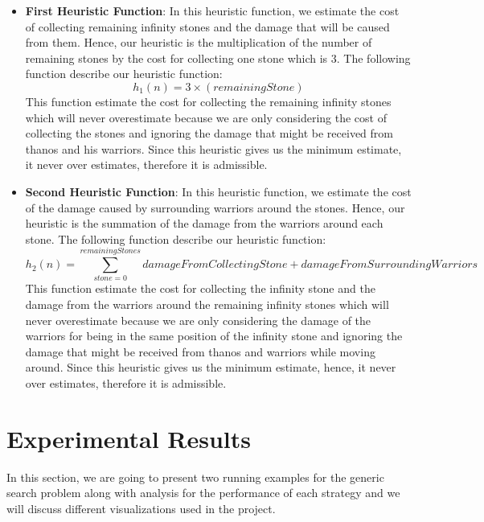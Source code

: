 \documentclass{article}
\begin{document}
\begin{itemize}
  \item \textbf{First Heuristic Function}: In this heuristic function, we estimate the cost of collecting remaining infinity stones and the damage that will be caused from them. Hence, our heuristic is the multiplication of the number of remaining stones by the cost for collecting one stone which is 3. The following function describe our heuristic function: 
   \begin{equation}
    h_{1}(n)=3 \times(remainingStone)
    \end{equation}
  This function estimate the cost for collecting the remaining infinity stones which will never overestimate because we are only considering the cost of collecting the stones and ignoring the damage that might be received from thanos and his warriors. Since this heuristic gives us the minimum estimate, it never over estimates, therefore it is admissible.

  \item \textbf{Second Heuristic Function}: In this heuristic function, we estimate the cost of the damage caused by surrounding warriors around the stones. Hence, our heuristic is the summation of the damage from the warriors around each stone. The following function describe our heuristic function:
  \begin{equation}
    h_{2}(n)= \sum_{stone=0}^{remainingStones} damageFromCollectingStone + damageFromSurroundingWarriors
    \end{equation}
  This function estimate the cost for collecting the infinity stone and the damage from the warriors around the remaining infinity stones which will never overestimate because we are only considering the damage of the warriors for being in the same position of the infinity stone and ignoring the damage that might be received from thanos and warriors while moving around. Since this heuristic gives us the minimum estimate, hence, it never over estimates, therefore it is admissible.
\end{itemize}

\section{Experimental Results}
In this section, we are going to present two running examples for the generic search problem along with analysis for the performance of each strategy and we will discuss different visualizations used in the project. 
\end{document}
